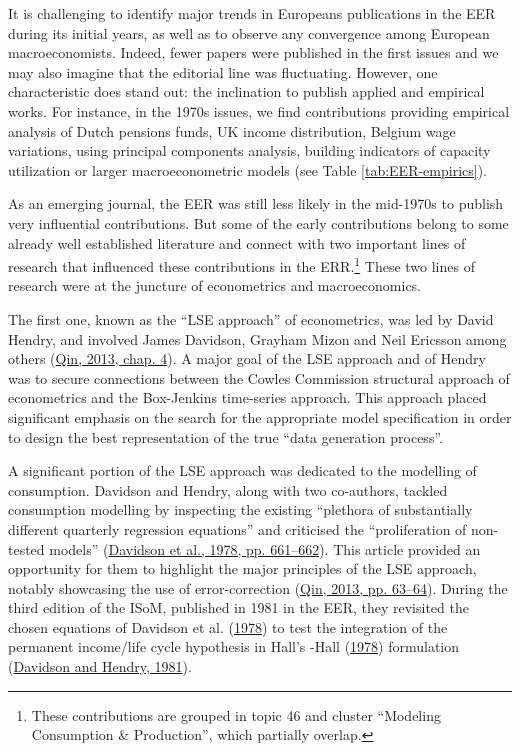 \documentclass[
  12pt,
  onecolumn]{article}
\begin{document}
It is challenging to identify major trends in Europeans publications in
the EER during its initial years, as well as to observe any convergence
among European macroeconomists. Indeed, fewer papers were published in
the first issues and we may also imagine that the editorial line was
fluctuating. However, one characteristic does stand out: the inclination
to publish applied and empirical works. For instance, in the 1970s
issues, we find contributions providing empirical analysis of Dutch
pensions funds, UK income distribution, Belgium wage variations, using
principal components analysis, building indicators of capacity
utilization or larger macroeconometric models (see Table
\ref{tab:EER-empirics}).

As an emerging journal, the EER was still less likely in the mid-1970s
to publish very influential contributions. But some of the early
contributions belong to some already well established literature and
connect with two important lines of research that influenced these
contributions in the ERR.\footnote{These contributions are grouped in
  topic 46 and cluster ``Modeling Consumption \& Production'', which
  partially overlap.} These two lines of research were at the juncture
of econometrics and macroeconomics.

The first one, known as the ``LSE approach'' of econometrics, was led by
David Hendry, and involved James Davidson, Grayham Mizon and Neil
Ericsson among others (\protect\hyperlink{ref-qin2013a}{Qin, 2013, chap.
4}). A major goal of the LSE approach and of Hendry was to secure
connections between the Cowles Commission structural approach of
econometrics and the Box-Jenkins time-series approach. This approach
placed significant emphasis on the search for the appropriate model
specification in order to design the best representation of the true
``data generation process''.

A significant portion of the LSE approach was dedicated to the modelling
of consumption. Davidson and Hendry, along with two co-authors, tackled
consumption modelling by inspecting the existing ``plethora of
substantially different quarterly regression equations'' and criticised
the ``proliferation of non-tested models''
(\protect\hyperlink{ref-davidson1978}{Davidson et al., 1978, pp.
661--662}). This article provided an opportunity for them to highlight
the major principles of the LSE approach, notably showcasing the use of
error-correction (\protect\hyperlink{ref-qin2013a}{Qin, 2013, pp.
63--64}). During the third edition of the ISoM, published in 1981 in the
EER, they revisited the chosen equations of Davidson et al.
(\protect\hyperlink{ref-davidson1978}{1978}) to test the integration of
the permanent income/life cycle hypothesis in Hall's -Hall
(\protect\hyperlink{ref-hall1978b}{1978}) formulation
(\protect\hyperlink{ref-davidson1981}{Davidson and Hendry, 1981}).
\end{document}
